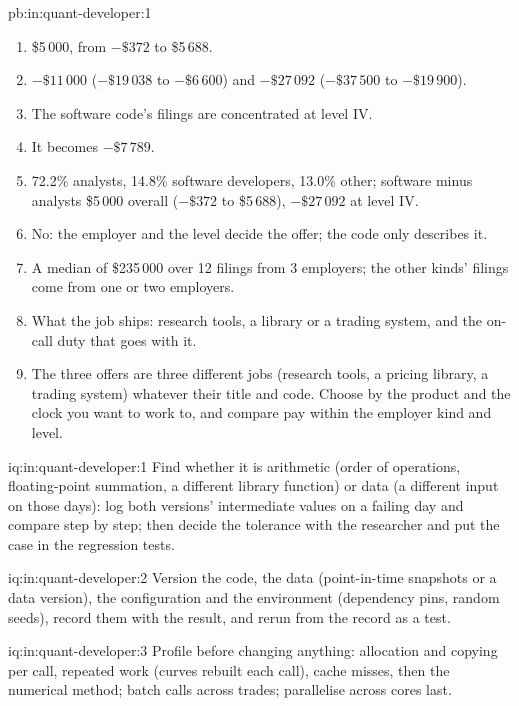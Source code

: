 \begin{solution}{pb:in:quant-developer:1}
\begin{enumerate}
percentile intervals.
\item \$5\,000, from $-\$372$ to \$5\,688.
\item $-\$11\,000$ ($-\$19\,038$ to $-\$6\,600$) and $-\$27\,092$ ($-\$37\,500$ to $-\$19\,900$).
\item The software code's filings are concentrated at level IV.
\item It becomes $-\$7\,789$.
\item 72.2\% analysts, 14.8\% software developers, 13.0\% other; software minus analysts \$5\,000 overall ($-\$372$ to
\$5\,688), $-\$27\,092$ at level IV.
\item No: the employer and the level decide the offer; the code only describes it.
\item A median of \$235\,000 over 12 filings from 3 employers; the other kinds' filings come from one or two employers.
\item What the job ships: research tools, a library or a trading system, and the on-call duty that goes with it.
\item The three offers are three different jobs (research tools, a pricing library, a trading system) whatever their title
and code. Choose by the product and the clock you want to work to, and compare pay within the employer kind and level.
\end{enumerate}
\end{solution}

\begin{solution}{iq:in:quant-developer:1}
Find whether it is arithmetic (order of operations, floating-point summation, a different library function) or data (a
different input on those days): log both versions' intermediate values on a failing day and compare step by step; then
decide the tolerance with the researcher and put the case in the regression tests.
\end{solution}

\begin{solution}{iq:in:quant-developer:2}
Version the code, the data (point-in-time snapshots or a data version), the configuration and the environment
(dependency pins, random seeds), record them with the result, and rerun from the record as a test.
\end{solution}

\begin{solution}{iq:in:quant-developer:3}
Profile before changing anything: allocation and copying per call, repeated work (curves rebuilt each call), cache misses,
then the numerical method; batch calls across trades; parallelise across cores last.
\end{solution}

